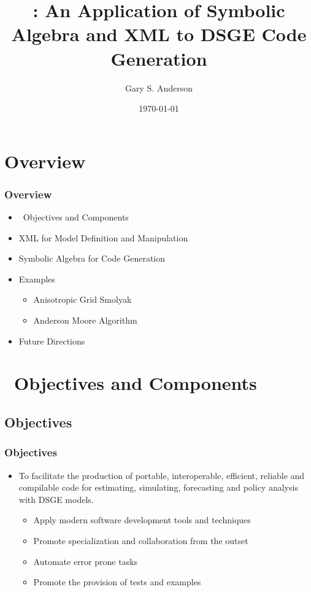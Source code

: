 \documentclass{beamer}
\begin{document}
\title[Symbolic Algebra/XML and Code Generation]{\dsgecg: An Application of Symbolic Algebra and XML to DSGE Code Generation}


\author{Gary S. Anderson}
\date{\today} 


\frame{\titlepage}


\section{Overview}



\begin{frame}
  \frametitle{Overview}
  
  \begin{itemize}
  \item \dsgecg\  Objectives and Components
  \item XML for Model Definition and Manipulation
  \item Symbolic Algebra for Code Generation
  \item Examples
    \begin{itemize}
    \item Anisotropic Grid Smolyak
    \item Anderson Moore Algorithm 
    \end{itemize}
  \item Future Directions
  \end{itemize}
\end{frame}

\section{\dsgecg\  Objectives and Components}

\subsection{Objectives}


\begin{frame}
  \frametitle{Objectives}  

{%
\begin{itemize}
\item To facilitate  
the production of  portable, interoperable, efficient, 
 reliable and compilable code  for estimating,  
simulating,  forecasting and  policy analysis with
DSGE models.
  \begin{itemize}
  \item Apply modern software development tools and techniques
  \item Promote specialization and collaboration from the outset
  \item Automate error prone tasks
  \item Promote the provision of tests and examples
  \end{itemize}
\end{itemize}
}
\end{frame}
\end{document}
